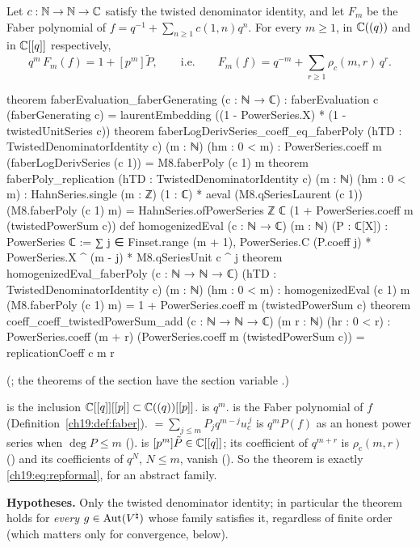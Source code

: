 \begin{theorem}\label{ch19:thm:repformal}
Let $c:{\mathbb{N}}\to{\mathbb{N}}\to{\mathbb{C}}$ satisfy the twisted denominator identity, and let $F_m$ be the Faber polynomial of
$f=q^{-1}+\sum_{n\ge1}c(1,n)q^n$.  For every $m\ge1$, in ${\mathbb{C}}((q))$ and in ${\mathbb{C}}[[q]]$ respectively,
\begin{equation*}
  q^m\,F_m(f)=1+[p^m]\tilde P,\qquad\text{i.e.}\qquad F_m(f)=q^{-m}+\sum_{r\ge1}\rho_c(m,r)\,q^r .
\end{equation*}
\end{theorem}
\begin{leancode}
theorem faberEvaluation_faberGenerating (c : ℕ → ℂ) :
    faberEvaluation c (faberGenerating c) =
      laurentEmbedding ((1 - PowerSeries.X) * (1 - twistedUnitSeries c))
theorem faberLogDerivSeries_coeff_eq_faberPoly (hTD : TwistedDenominatorIdentity c) (m : ℕ)
    (hm : 0 < m) :
    PowerSeries.coeff m (faberLogDerivSeries (c 1)) = M8.faberPoly (c 1) m
theorem faberPoly_replication (hTD : TwistedDenominatorIdentity c) (m : ℕ) (hm : 0 < m) :
    HahnSeries.single (m : ℤ) (1 : ℂ) * aeval (M8.qSeriesLaurent (c 1)) (M8.faberPoly (c 1) m) =
      HahnSeries.ofPowerSeries ℤ ℂ (1 + PowerSeries.coeff m (twistedPowerSum c))
def homogenizedEval (c : ℕ → ℂ) (m : ℕ) (P : ℂ[X]) : PowerSeries ℂ :=
  ∑ j ∈ Finset.range (m + 1),
    PowerSeries.C (P.coeff j) * PowerSeries.X ^ (m - j) * M8.qSeriesUnit c ^ j
theorem homogenizedEval_faberPoly (c : ℕ → ℕ → ℂ) (hTD : TwistedDenominatorIdentity c) (m : ℕ)
    (hm : 0 < m) :
    homogenizedEval (c 1) m (M8.faberPoly (c 1) m) =
      1 + PowerSeries.coeff m (twistedPowerSum c)
theorem coeff_coeff_twistedPowerSum_add (c : ℕ → ℕ → ℂ) (m r : ℕ) (hr : 0 < r) :
    PowerSeries.coeff (m + r) (PowerSeries.coeff m (twistedPowerSum c)) =
      replicationCoeff c m r
\end{leancode}
(; the theorems of the section  have the section
variable .)
\begin{dictionary}
 is the inclusion ${\mathbb{C}}[[q]][[p]]\subset{\mathbb{C}}((q))[[p]]$.   is $q^m$.
 is the Faber polynomial of $f$ (Definition~\ref{ch19:def:faber}).
 $=\sum_{j\le m}P_jq^{m-j}u_c^{\,j}$ is $q^mP(f)$ as an honest power series when $\deg P\le m$
().   is $[p^m]\tilde P\in{\mathbb{C}}[[q]]$; its
coefficient of $q^{m+r}$ is $\rho_c(m,r)$ () and its coefficients of $q^N$, $N\le m$, vanish
().  So the theorem is exactly \eqref{ch19:eq:repformal}, for an abstract family.

\textbf{Hypotheses.}  Only the twisted denominator identity; in particular the theorem holds for \emph{every} $g\in\operatorname{Aut}({V^{\natural}})$
whose family satisfies it, regardless of finite order (which matters only for convergence, below).
\end{dictionary}
